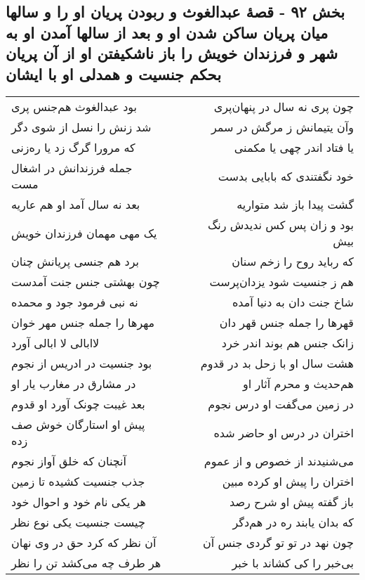 \begin{center}
\section*{بخش ۹۲ - قصهٔ عبدالغوث و ربودن پریان او را و سالها میان پریان ساکن شدن او و بعد از سالها آمدن او به شهر و فرزندان خویش را باز ناشکیفتن او از آن پریان بحکم جنسیت و همدلی او با ایشان}
\label{sec:sh092}
\begin{longtable}{l p{0.5cm} r}
بود عبدالغوث هم‌جنس پری
&&
چون پری نه سال در پنهان‌پری
\\
شد زنش را نسل از شوی دگر
&&
وآن یتیمانش ز مرگش در سمر
\\
که مرورا گرگ زد یا ره‌زنی
&&
یا فتاد اندر چهی یا مکمنی
\\
جمله فرزندانش در اشغال مست
&&
خود نگفتندی که بابایی بدست
\\
بعد نه سال آمد او هم عاریه
&&
گشت پیدا باز شد متواریه
\\
یک مهی مهمان فرزندان خویش
&&
بود و زان پس کس ندیدش رنگ بیش
\\
برد هم جنسی پریانش چنان
&&
که رباید روح را زخم سنان
\\
چون بهشتی جنس جنت آمدست
&&
هم ز جنسیت شود یزدان‌پرست
\\
نه نبی فرمود جود و محمده
&&
شاخ جنت دان به دنیا آمده
\\
مهرها را جمله جنس مهر خوان
&&
قهرها را جمله جنس قهر دان
\\
لاابالی لا ابالی آورد
&&
زانک جنس هم بوند اندر خرد
\\
بود جنسیت در ادریس از نجوم
&&
هشت سال او با زحل بد در قدوم
\\
در مشارق در مغارب یار او
&&
هم‌حدیث و محرم آثار او
\\
بعد غیبت چونک آورد او قدوم
&&
در زمین می‌گفت او درس نجوم
\\
پیش او استارگان خوش صف زده
&&
اختران در درس او حاضر شده
\\
آنچنان که خلق آواز نجوم
&&
می‌شنیدند از خصوص و از عموم
\\
جذب جنسیت کشیده تا زمین
&&
اختران را پیش او کرده مبین
\\
هر یکی نام خود و احوال خود
&&
باز گفته پیش او شرح رصد
\\
چیست جنسیت یکی نوع نظر
&&
که بدان یابند ره در هم‌دگر
\\
آن نظر که کرد حق در وی نهان
&&
چون نهد در تو تو گردی جنس آن
\\
هر طرف چه می‌کشد تن را نظر
&&
بی‌خبر را کی کشاند با خبر
\\

\end{longtable}
\end{center}
